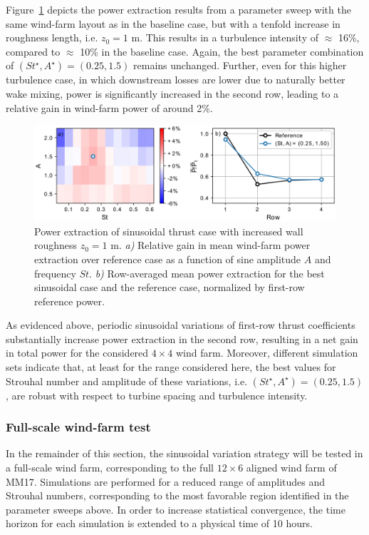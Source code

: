 \documentclass[wes, manuscript]{copernicus}
\begin{document}
Figure~\ref{fig:sinus_roughness} depicts the power extraction results from a parameter sweep with the same wind-farm layout as in the baseline case, but with a tenfold increase in roughness length, i.e. $z_0 = 1$ m. This results in a turbulence intensity of $\approx$ 16\%, compared to $\approx$ 10\% in the baseline case. Again, the best parameter combination of $(St^\star, A^\star) = (0.25, 1.5)$ remains unchanged. Further, even for this higher turbulence case, in which downstream losses are lower due to naturally better wake mixing, power is significantly increased in the second row, leading to a relative gain in wind-farm power of around 2\%. 
\begin{figure}
	\centering
	\includegraphics[width=\textwidth]{gains_turbulent_6D_6D_6D_wide_antiphase_z0_1m2.eps}
	\caption{Power extraction of sinusoidal thrust case with increased wall roughness $z_0 = 1$ m. \emph{a) } Relative gain in mean wind-farm power extraction over reference case as a function of sine amplitude $A$ and frequency $St$. \emph{b) } Row-averaged mean power extraction for the best sinusoidal case and the reference case, normalized by first-row reference power.\label{fig:sinus_roughness} }
\end{figure}


As evidenced above, periodic sinusoidal variations of first-row thrust coefficients substantially increase power extraction in the second row, resulting in a net gain in total power for the considered $4\times4$ wind farm. Moreover, different simulation sets indicate that, at least for the range considered here, the best values for Strouhal number and amplitude of these variations, i.e. $(St^\star, A^\star) = (0.25, 1.5)$, are robust with respect to turbine spacing and turbulence intensity. 

\subsubsection{Full-scale wind-farm test}
In the remainder of this section, the sinusoidal variation strategy will be tested in a full-scale wind farm, corresponding to the full $12 \times 6$ aligned wind farm of MM17. Simulations are performed for a reduced range of amplitudes and Strouhal numbers, corresponding to the most favorable region identified in the parameter sweeps above. In order to increase statistical convergence, the time horizon for each simulation is extended to a physical time of 10 hours. 
\end{document}
